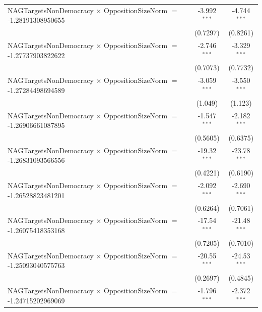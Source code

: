 \begin{tabular}{lcc}
   NAGTargetsNonDemocracy $\times$ OppositionSizeNorm $=$ -1.28191308950655     & -3.992$^{***}$       & -4.744$^{***}$\\   
                                                                                & (0.7297)             & (0.8261)\\   
   NAGTargetsNonDemocracy $\times$ OppositionSizeNorm $=$ -1.27737903822622     & -2.746$^{***}$       & -3.329$^{***}$\\   
                                                                                & (0.7073)             & (0.7732)\\   
   NAGTargetsNonDemocracy $\times$ OppositionSizeNorm $=$ -1.27284498694589     & -3.059$^{***}$       & -3.550$^{***}$\\   
                                                                                & (1.049)              & (1.123)\\   
   NAGTargetsNonDemocracy $\times$ OppositionSizeNorm $=$ -1.26906661087895     & -1.547$^{***}$       & -2.182$^{***}$\\   
                                                                                & (0.5605)             & (0.6375)\\   
   NAGTargetsNonDemocracy $\times$ OppositionSizeNorm $=$ -1.26831093566556     & -19.32$^{***}$       & -23.78$^{***}$\\   
                                                                                & (0.4221)             & (0.6190)\\   
   NAGTargetsNonDemocracy $\times$ OppositionSizeNorm $=$ -1.26528823481201     & -2.092$^{***}$       & -2.690$^{***}$\\   
                                                                                & (0.6264)             & (0.7061)\\   
   NAGTargetsNonDemocracy $\times$ OppositionSizeNorm $=$ -1.26075418353168     & -17.54$^{***}$       & -21.48$^{***}$\\   
                                                                                & (0.7205)             & (0.7010)\\   
   NAGTargetsNonDemocracy $\times$ OppositionSizeNorm $=$ -1.25093040575763     & -20.55$^{***}$       & -24.53$^{***}$\\   
                                                                                & (0.2697)             & (0.4845)\\   
   NAGTargetsNonDemocracy $\times$ OppositionSizeNorm $=$ -1.24715202969069     & -1.796$^{***}$       & -2.372$^{***}$\\   

\end{tabular}
